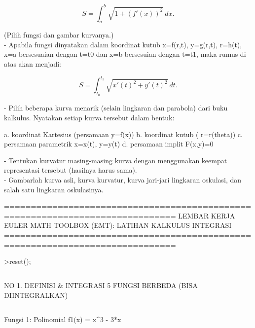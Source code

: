 \documentclass{article}
\newenvironment{eulernotebook}{\par}{\par}
\newcommand{\eulersubheading}[1]{\subsection{#1}}
\newenvironment{eulercomment}{\par\medskip}{\par\medskip}
\newenvironment{eulerformula}{}{}
\begin{document}
\begin{eulernotebook}
\begin{eulercomment}
\begin{eulercomment}
\begin{eulercomment}
\begin{eulercomment}
\begin{eulercomment}
\end{eulercomment}
\begin{eulerformula}
\[
S = \int_a^b \sqrt{1+(f'(x))^2} \ dx.
\]
\end{eulerformula}
\begin{eulercomment}
(Pilih fungsi dan gambar kurvanya.)\\
- Apabila fungsi dinyatakan dalam koordinat kutub x=f(r,t), y=g(r,t), r=h(t), x=a bersesuaian dengan t=t0 dan x=b bersesuian
dengan t=t1, maka rumus di atas akan menjadi:

\end{eulercomment}
\begin{eulerformula}
\[
S=\int_{t_0}^{t_1} \sqrt{x'(t)^2+y'(t)^2}\ dt.
\]
\end{eulerformula}
\begin{eulercomment}
- Pilih beberapa kurva menarik (selain lingkaran dan parabola) dari buku  kalkulus. Nyatakan setiap kurva tersebut dalam bentuk:\\
\end{eulercomment}
\begin{eulerttcomment}
  a. koordinat Kartesius (persamaan y=f(x))
  b. koordinat kutub ( r=r(theta))
  c. persamaan parametrik x=x(t), y=y(t)
  d. persamaan implit F(x,y)=0
\end{eulerttcomment}
\begin{eulercomment}
- Tentukan kurvatur masing-masing kurva dengan menggunakan keempat representasi tersebut (hasilnya harus sama).\\
- Gambarlah kurva asli, kurva kurvatur, kurva jari-jari lingkaran oskulasi, dan salah satu lingkaran oskulasinya.
\end{eulercomment}
\begin{eulercomment}
==============================================================================
LEMBAR KERJA EULER MATH TOOLBOX (EMT): LATIHAN KALKULUS INTEGRASI
==============================================================================
\end{eulercomment}
\begin{eulerprompt}
>reset();
\end{eulerprompt}
\eulersubheading{}
\begin{eulercomment}
NO 1. DEFINISI \& INTEGRASI 5 FUNGSI BERBEDA (BISA DIINTEGRALKAN)
\end{eulercomment}
\eulersubheading{}
\begin{eulercomment}
Fungsi 1: Polinomial f1(x) = x\textasciicircum{}3 - 3*x
\end{eulercomment}

\end{eulercomment}
\end{eulercomment}
\end{eulercomment}
\end{eulercomment}
\end{eulernotebook}
\end{document}
